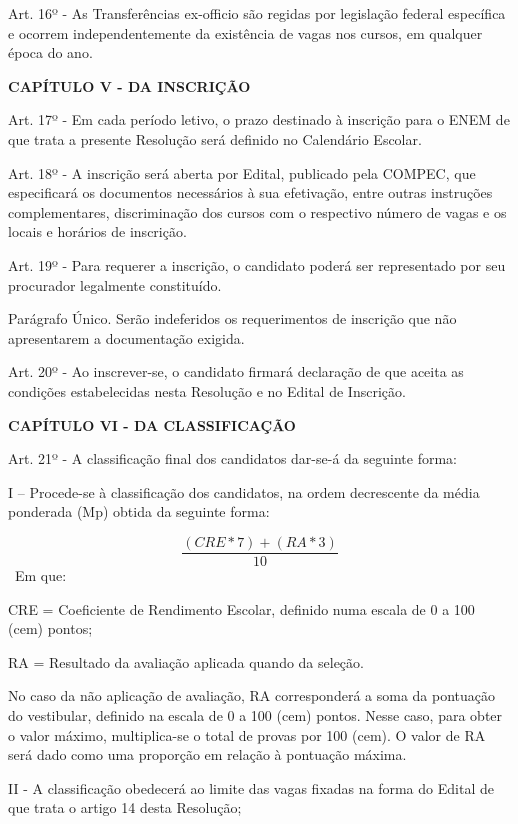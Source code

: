 \vspace{1mm}
Art. 16º - As Transferências ex-officio são regidas por legislação federal específica e ocorrem independentemente da existência de vagas nos cursos, em qualquer época do ano.

\vspace{4mm}
\textbf{CAPÍTULO V - DA INSCRIÇÃO}
\vspace{4mm}

Art. 17º - Em cada período letivo, o prazo destinado à inscrição para o ENEM de que trata a presente Resolução será definido no Calendário Escolar.

Art. 18º - A inscrição será aberta por Edital, publicado pela COMPEC, que especificará os documentos necessários à sua efetivação, entre outras instruções complementares, discriminação dos cursos com o respectivo número de vagas e os locais e horários de inscrição.

Art. 19º - Para requerer a inscrição, o candidato poderá ser representado por seu procurador legalmente constituído.

Parágrafo Único. Serão indeferidos os requerimentos de inscrição que não apresentarem a documentação exigida.

Art. 20º - Ao inscrever-se, o candidato firmará declaração de que aceita as condições estabelecidas nesta Resolução e no Edital de Inscrição.

\vspace{4mm}
\textbf{CAPÍTULO VI - DA CLASSIFICAÇÃO}
\vspace{4mm}

Art. 21º - A classificação final dos candidatos dar-se-á da seguinte forma:

I – Procede-se à classificação dos candidatos, na ordem decrescente da média ponderada (Mp) obtida da seguinte forma:

$$ 
\frac{(CRE*7) + (RA*3)}{10}
$$
~Em que:

CRE = Coeficiente de Rendimento Escolar, definido numa escala de 0 a 100 (cem) pontos;

RA = Resultado da avaliação aplicada quando da seleção.

No caso da não aplicação de avaliação, RA corresponderá a soma da pontuação do vestibular, definido na escala de 0 a 100 (cem) pontos. Nesse caso, para obter o valor máximo, multiplica-se o total de provas por 100 (cem). O valor de RA será dado como uma proporção em relação à pontuação máxima.

II - A classificação obedecerá ao limite das vagas fixadas na forma do Edital de que trata o artigo 14 desta Resolução;

